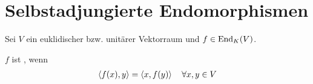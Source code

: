 \section{Selbstadjungierte Endomorphismen}

Sei $V$ ein euklidischer bzw. unitärer Vektorraum und $f\in\operatorname{End}_K(V)$.

\begin{definition}[selbstadjungiert]
	$f$ ist , wenn
	\begin{align}
		\left\langle f(x),y\right\rangle=\left\langle x,f(y)\right\rangle\quad\forall x,y\in V\notag
	\end{align}
\end{definition}